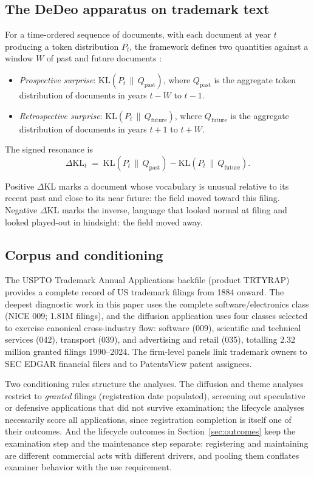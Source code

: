 \documentclass[11pt]{article}
\newcommand{\dkl}{$\Delta$KL}
\begin{document}
\subsection{The DeDeo apparatus on trademark text}

For a time-ordered sequence of documents, with each document at year $t$
producing a token distribution $P_t$, the framework defines two quantities
against a window $W$ of past and future documents
\citep{Murdock2017, Barron2018}:

\begin{itemize}[noitemsep]
  \item \textit{Prospective surprise}: $\mathrm{KL}(P_t \,\|\, Q_{\mathrm{past}})$, where $Q_{\mathrm{past}}$ is the aggregate token distribution of documents in years $t-W$ to $t-1$.
  \item \textit{Retrospective surprise}: $\mathrm{KL}(P_t \,\|\, Q_{\mathrm{future}})$, where $Q_{\mathrm{future}}$ is the aggregate distribution of documents in years $t+1$ to $t+W$.
\end{itemize}

\noindent The signed resonance is
\[
\Delta\mathrm{KL}_t \;=\; \mathrm{KL}(P_t \,\|\, Q_{\mathrm{past}}) - \mathrm{KL}(P_t \,\|\, Q_{\mathrm{future}}).
\]

Positive \dkl{} marks a document whose vocabulary is unusual relative to its
recent past and close to its near future: the field moved toward this
filing. Negative \dkl{} marks the inverse, language that looked normal at
filing and looked played-out in hindsight: the field moved away.

\subsection{Corpus and conditioning}

The USPTO Trademark Annual Applications backfile (product TRTYRAP) provides
a complete record of US trademark filings from 1884 onward. The deepest
diagnostic work in this paper uses the complete software/electronics class
(NICE 009; 1.81M filings), and the diffusion application uses four classes
selected to exercise canonical cross-industry flow: software (009),
scientific and technical services (042), transport (039), and advertising
and retail (035), totalling 2.32 million granted filings 1990--2024. The
firm-level panels link trademark owners to SEC EDGAR financial filers and
to PatentsView patent assignees.

Two conditioning rules structure the analyses. The diffusion and theme
analyses restrict to \emph{granted} filings (registration date
populated), screening out speculative or defensive applications that did
not survive examination; the lifecycle analyses necessarily score all
applications, since registration completion is itself one of their
outcomes. And the lifecycle outcomes in Section~\ref{sec:outcomes} keep
the examination step and the maintenance step separate: registering and
maintaining are different commercial acts with different drivers, and
pooling them conflates examiner behavior with the use requirement.
\end{document}

